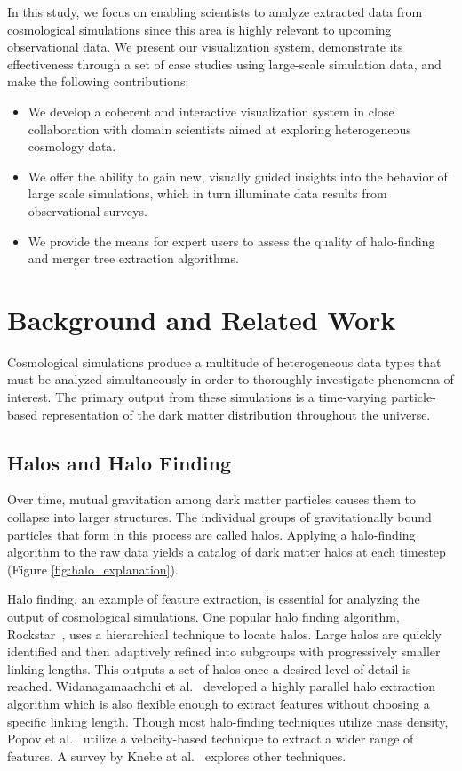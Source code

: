 In this study, we focus on enabling scientists to analyze extracted data from cosmological simulations since this area is highly relevant to upcoming observational data. We present our visualization system, demonstrate its effectiveness through a set of case studies using large-scale simulation data, and make the following contributions:

\vspace{-0.9\topsep}
\begin{itemize} \itemsep1pt \parskip1pt 
  \item We develop a coherent and interactive visualization system in close collaboration with domain scientists aimed at exploring heterogeneous cosmology data.
  \item We offer the ability to gain new, visually guided insights into the behavior of large scale simulations, which in turn illuminate data results from observational surveys.
  \item We provide the means for expert users to assess the quality of halo-finding and merger tree extraction algorithms.
\end{itemize}
\vspace{-0.9\topsep}

\section{Background and Related Work}
Cosmological simulations produce a multitude of heterogeneous data types that must be analyzed simultaneously in order to thoroughly investigate phenomena of interest. The primary output from these simulations is a time-varying particle-based representation of the dark matter distribution throughout the universe.

\subsection{Halos and Halo Finding}
Over time, mutual gravitation among dark matter particles causes them to collapse into larger structures. The individual groups of gravitationally bound particles that form in this process are called halos. Applying a halo-finding algorithm to the raw data yields a catalog of dark matter halos at each timestep (Figure \ref{fig:halo_explanation}).

Halo finding, an example of feature extraction, is essential for analyzing the output of cosmological simulations. One popular halo finding algorithm, Rockstar~\cite{Behroozi:2013}, uses a hierarchical technique to locate halos. Large halos are quickly identified and then adaptively refined into subgroups with progressively smaller linking lengths. This outputs a set of halos once a desired level of detail is reached. Widanagamaachchi et al.~\cite{Widanagamaachchi:2014} developed a highly parallel halo extraction algorithm which is also flexible enough to extract features without choosing a specific linking length. Though most halo-finding techniques utilize mass density, Popov et al.~\cite{Popov:2011} utilize a velocity-based technique to extract a wider range of features. A survey by Knebe at al.~\cite{Knebe:2011} explores other techniques.

